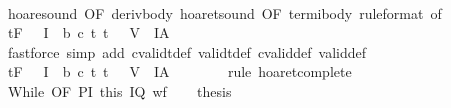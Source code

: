 \begin{isabellebody}
\ \ \isamarkupfalse%
\ \isanewline
\ \ \ \ \isamarkupfalse%
\ {\isasymsigma}\isanewline
\ \ \ \ \isamarkupfalse%
\ hoare{\isacharunderscore}sound\ {\isacharbrackleft}OF\ deriv{\isacharunderscore}body{\isacharbrackright}\ hoaret{\isacharunderscore}sound\ {\isacharbrackleft}OF\ termi{\isacharunderscore}body\ {\isacharbrackleft}rule{\isacharunderscore}format{\isacharcomma}\ of\ {\isasymsigma}{\isacharbrackright}{\isacharbrackright}\isanewline
\ \ \ \ \isamarkupfalse%
\ {\isachardoublequoteopen}{\isasymGamma}{\isacharcomma}{\isasymTheta}{\isasymTurnstile}\isactrlsub t\isactrlbsub {\isacharslash}F\isactrlesub \ {\isacharparenleft}{\isacharbraceleft}{\isasymsigma}{\isacharbraceright}\ {\isasyminter}\ I\ {\isasyminter}\ b{\isacharparenright}\ c\ {\isacharparenleft}{\isacharbraceleft}t{\isachardot}\ {\isacharparenleft}t{\isacharcomma}\ {\isasymsigma}{\isacharparenright}\ {\isasymin}\ V{\isacharbraceright}\ {\isasyminter}\ I{\isacharparenright}{\isacharcomma}A{\isachardoublequoteclose}\isanewline
\ \ \ \ \ \ \isamarkupfalse%
\ {\isacharparenleft}fastforce\ simp\ add{\isacharcolon}\ cvalidt{\isacharunderscore}def\ validt{\isacharunderscore}def\ cvalid{\isacharunderscore}def\ valid{\isacharunderscore}def{\isacharparenright}\isanewline
\ \ \ \ \isamarkupfalse%
\isanewline
\ \ \ \ \isamarkupfalse%
\ {\isachardoublequoteopen}{\isasymGamma}{\isacharcomma}{\isasymTheta}{\isasymturnstile}\isactrlsub t\isactrlbsub {\isacharslash}F\isactrlesub \ {\isacharparenleft}{\isacharbraceleft}{\isasymsigma}{\isacharbraceright}\ {\isasyminter}\ I\ {\isasyminter}\ b{\isacharparenright}\ c\ {\isacharparenleft}{\isacharbraceleft}t{\isachardot}\ {\isacharparenleft}t{\isacharcomma}\ {\isasymsigma}{\isacharparenright}\ {\isasymin}\ V{\isacharbraceright}\ {\isasyminter}\ I{\isacharparenright}{\isacharcomma}A{\isachardoublequoteclose}\isanewline
\ \ \ \ \ \ \isamarkupfalse%
\ {\isacharparenleft}rule\ hoaret{\isacharunderscore}complete{\isacharprime}{\isacharparenright}\isanewline
\ \ \isamarkupfalse%
\isanewline
\isanewline
\ \ \isamarkupfalse%
\ While\ {\isacharbrackleft}OF\ P{\isacharunderscore}I\ this\ I{\isacharunderscore}Q\ wf{\isacharbrackright}\isanewline
\ \ \isamarkupfalse%
\ {\isacharquery}thesis\ \isacommand{{\isachardot}}\isamarkupfalse%
\isanewline
{}\isamarkupfalse%
%
\endisatagproof
{\isafoldproof}%
%
\isadelimproof
\isanewline
%
\endisadelimproof
\isanewline
\isanewline
{}\isamarkupfalse%

\end{isabellebody}
